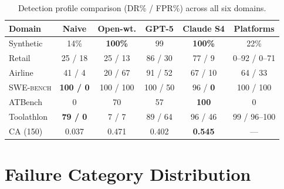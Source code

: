 \documentclass[11pt]{article}
\newcommand{\swebench}{\textsc{SWE-bench}\xspace}
\begin{document}
\begin{table}[h]
\centering
\caption{Detection profile comparison (DR\% / FPR\%) across all six domains.}
\label{tab:profiles}
\small
\begin{tabular}{@{}lccccc@{}}
\toprule
\textbf{Domain} & \textbf{Naive} & \textbf{Open-wt.} & \textbf{GPT-5} & \textbf{Claude S4} & \textbf{Platforms} \\
\midrule
Synthetic    & 14\%              & \textbf{100\%}     & 99             & \textbf{100\%}           & 22\% \\
Retail       & 25 / 18           & 25 / 13            & 86 / 30        & 77 / 9                   & 0--92 / 0--71 \\
Airline      & 41 / 4            & 20 / 67            & 91 / 52        & 67 / 10                  & 64 / 33 \\
\swebench    & \textbf{100 / 0}  & 100 / 100          & 100 / 50       & 96 / \textbf{0}          & 100 / 100 \\
ATBench      & 0                 & 70                 & 57             & \textbf{100}             & 0 \\
Toolathlon   & \textbf{79 / 0}   & 7 / 7              & 89 / 64        & 96 / 46                  & 99 / 96--100 \\
\midrule
CA (150)     & 0.037             & 0.471              & 0.402          & \textbf{0.545}           & --- \\
\bottomrule
\end{tabular}
\end{table}

\section{Failure Category Distribution}
\label{app:failure_dist}
\end{document}
